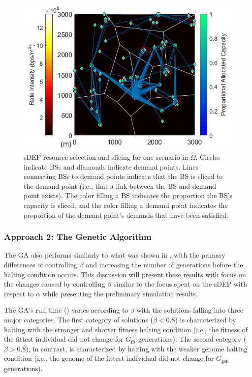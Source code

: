 \documentclass[12pt,dvipsnames]{report}
\begin{document}
\begin{figure}[htp]
	\centering
	\includegraphics[height=0.4\textheight]{Figures/CaseI_VoronoiDemandAllocation_sDEP_10BS_snip2}
	\caption[One Case I sDEP resource selection and slicing solution]{sDEP resource selection and slicing for one scenario in $\hat{\Omega}$.  Circles indicate BSs and diamonds indicate demand points.  Lines connecting BSs to demand points indicate that the BS is sliced to the demand point (i.e., that a link between the BS and demand point exists).  The color filling a BS indicates the proportion the BS's capacity is sliced, and the color filling a demand point indicates the proportion of the demand point's demands that have been satisfied.}
	\label{fig:CaseI_VoronoiDemandAllocation_sDEP}
\end{figure}

\subsubsection{Approach 2: The Genetic Algorithm}

The GA also performs similarly to what was shown in , with the primary differences of controlling $\beta$ and increasing the number of generations before the halting condition occurs.  This discussion will present these results with focus on the changes caused by controlling $\beta$ similar to the focus spent on the sDEP with respect to $\alpha$ while presenting the preliminary simulation results.

The GA's run time () varies according to $\beta$ with the solutions falling into three major categories.  The first category of solutions ($\beta < 0.8$) is characterized by halting with the stronger and shorter fitness halting condition (i.e., the fitness of the fittest individual did not change for $G_{\text{fit}}$ generations).  The second category ($\beta > 0.8$), in contrast, is characterized by halting with the weaker genome halting condition (i.e., the genome of the fittest individual did not change for $G_{\text{gen}}$ generations).
\end{document}

